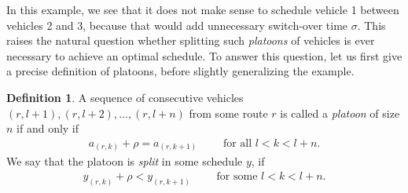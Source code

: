 \documentclass[a4paper]{report}
\theoremstyle{definition}
\newtheorem{define}{Definition}[chapter]
\theoremstyle{plain}
\begin{document}
In this example, we see that it does not make sense to schedule vehicle 1
between vehicles 2 and 3, because that would add unnecessary switch-over time
$\sigma$. This raises the natural question whether splitting such \textit{platoons} of
vehicles is ever necessary to achieve an optimal schedule. To answer this
question, let us first give a precise definition of platoons, before slightly
generalizing the example.
%
\begin{define}
  A sequence of consecutive vehicles $(r, l+1), (r, l+2), \dots, (r, l+n)$ from
  some route $r$ is called a \textit{platoon} of size $n$ if and only if
  \begin{align}
  a_{(r,k)} + \rho = a_{(r, k+1)}  \quad \quad \text{ for all } l < k < l + n.
  \end{align}
 We say that the platoon is \textit{split}
  in some schedule $y$, if
  \begin{align}
  y_{(r, k)} + \rho < y_{(r, k + 1)} \quad \quad \text{ for some } l < k < l + n.
  \end{align}
\end{define}
%
\end{document}
